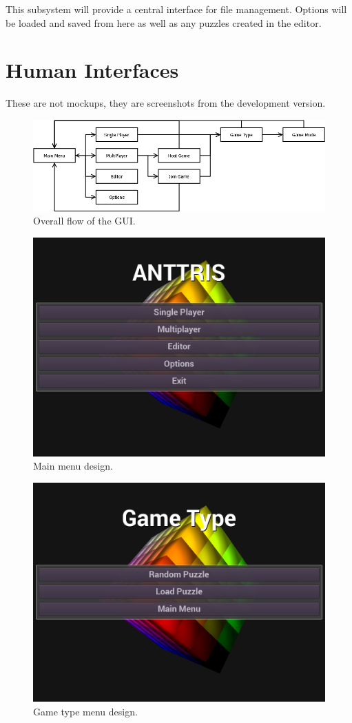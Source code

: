 \documentclass[12pt]{article}
\begin{document}
This subsystem will provide a central interface for file management. Options will be loaded and saved from here as well as any puzzles created in the editor.
\section{Human Interfaces} %
These are not mockups, they are screenshots from the development version.

	\begin{figure}[H]
        \centering
        \includegraphics[width=4.5in]{Anttris_MenuFlow.png}
        \caption{Overall flow of the GUI.}
    \end{figure}
    \begin{figure}[H]
        \centering
        \includegraphics[width=4.5in]{Anttris_MainMenu.png}
        \caption{Main menu design.}
    \end{figure}
    \begin{figure}[H]
        \centering
        \includegraphics[width=4.5in]{Anttris_GTMenu.png}
        \caption{Game type menu design.}
    \end{figure}
\end{document}
